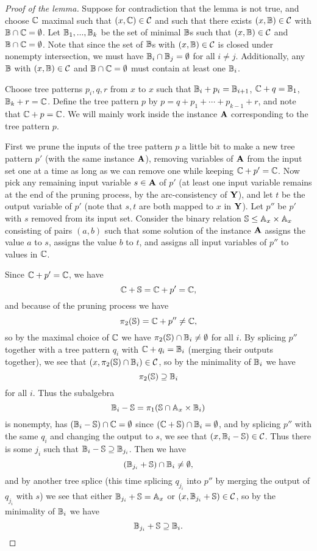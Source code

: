 \documentclass[letterpaper,11pt]{article}
\begin{document}
\begin{proof}[Proof of the lemma] Suppose for contradiction that the lemma is not true, and choose $\mathbb{C}$ maximal such that $(x,\mathbb{C}) \in \mathcal{C}$ and such that there exists $(x,\mathbb{B}) \in \mathcal{C}$ with $\mathbb{B} \cap \mathbb{C} = \emptyset$. Let $\mathbb{B}_1, ..., \mathbb{B}_k$ be the set of minimal $\mathbb{B}$s such that $(x,\mathbb{B}) \in \mathcal{C}$ and $\mathbb{B} \cap \mathbb{C} = \emptyset$. Note that since the set of $\mathbb{B}$s with $(x,\mathbb{B}) \in \mathcal{C}$ is closed under nonempty intersection, we must have $\mathbb{B}_i \cap \mathbb{B}_j = \emptyset$ for all $i \ne j$. Additionally, any $\mathbb{B}$ with $(x,\mathbb{B}) \in \mathcal{C}$ and $\mathbb{B} \cap \mathbb{C} = \emptyset$ must contain at least one $\mathbb{B}_i$.

Choose tree patterns $p_i, q, r$ from $x$ to $x$ such that $\mathbb{B}_i + p_i = \mathbb{B}_{i+1}$, $\mathbb{C} + q = \mathbb{B}_1$, $\mathbb{B}_k + r = \mathbb{C}$. Define the tree pattern $p$ by $p = q + p_1 + \cdots + p_{k-1} + r$, and note that $\mathbb{C} + p = \mathbb{C}$. We will mainly work inside the instance $\mathbf{A}$ corresponding to the tree pattern $p$.

First we prune the inputs of the tree pattern $p$ a little bit to make a new tree pattern $p'$ (with the same instance $\mathbf{A}$), removing variables of $\mathbf{A}$ from the input set one at a time as long as we can remove one while keeping $\mathbb{C} + p' = \mathbb{C}$. Now pick any remaining input variable $s \in \mathbf{A}$ of $p'$ (at least one input variable remains at the end of the pruning process, by the arc-consistency of $\mathbf{Y}$), and let $t$ be the output variable of $p'$ (note that $s,t$ are both mapped to $x$ in $\mathbf{Y}$). Let $p''$ be $p'$ with $s$ removed from its input set. Consider the binary relation $\mathbb{S} \le \mathbb{A}_x \times \mathbb{A}_x$ consisting of pairs $(a,b)$ such that some solution of the instance $\mathbf{A}$ assigns the value $a$ to $s$, assigns the value $b$ to $t$, and assigns all input variables of $p''$ to values in $\mathbb{C}$.

Since $\mathbb{C} + p' = \mathbb{C}$, we have
\[
\mathbb{C} + \mathbb{S} = \mathbb{C} + p' = \mathbb{C},
\]
and because of the pruning process we have
\[
\pi_2(\mathbb{S}) = \mathbb{C} + p'' \ne \mathbb{C},
\]
so by the maximal choice of $\mathbb{C}$ we have $\pi_2(\mathbb{S}) \cap \mathbb{B}_i \ne \emptyset$ for all $i$. By splicing $p''$ together with a tree pattern $q_i$ with $\mathbb{C} + q_i = \mathbb{B}_i$ (merging their outputs together), we see that $(x,\pi_2(\mathbb{S}) \cap \mathbb{B}_i) \in \mathcal{C}$, so by the minimality of $\mathbb{B}_i$ we have
\[
\pi_2(\mathbb{S}) \supseteq \mathbb{B}_i
\]
for all $i$. Thus the subalgebra
\[
\mathbb{B}_i - \mathbb{S} = \pi_1(\mathbb{S} \cap \mathbb{A}_x\times \mathbb{B}_i)
\]
is nonempty, has $(\mathbb{B}_i-\mathbb{S}) \cap \mathbb{C} = \emptyset$ since $(\mathbb{C}+\mathbb{S}) \cap \mathbb{B}_i = \emptyset$, and by splicing $p''$ with the same $q_i$ and changing the output to $s$, we see that $(x,\mathbb{B}_i-\mathbb{S}) \in \mathcal{C}$. Thus there is some $j_i$ such that $\mathbb{B}_i-\mathbb{S} \supseteq \mathbb{B}_{j_i}$. Then we have
\[
(\mathbb{B}_{j_i} + \mathbb{S}) \cap \mathbb{B}_i \ne \emptyset,
\]
and by another tree splice (this time splicing $q_{j_i}$ into $p''$ by merging the output of $q_{j_i}$ with $s$) we see that either $\mathbb{B}_{j_i} + \mathbb{S} = \mathbb{A}_x$ or $(x,\mathbb{B}_{j_i} + \mathbb{S}) \in \mathcal{C}$, so by the minimality of $\mathbb{B}_i$ we have
\[
\mathbb{B}_{j_i} + \mathbb{S} \supseteq \mathbb{B}_i.
\]


\end{proof}
\end{document}
